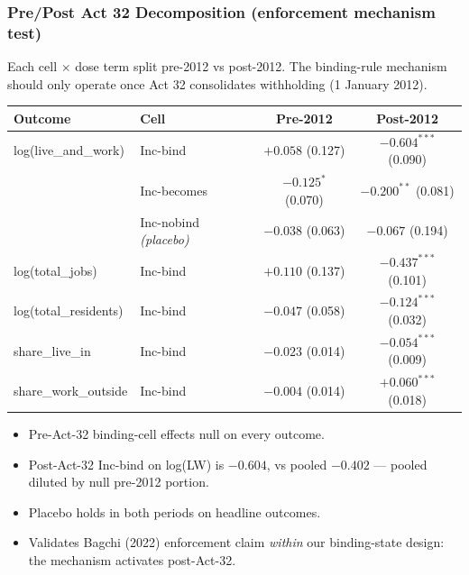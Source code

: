 \documentclass[xcolor = x11names, compress, aspectratio = 169]{beamer}
\begin{document}
    \begin{frame}
    \frametitle{Pre/Post Act 32 Decomposition (enforcement mechanism test)}
        \footnotesize
        Each cell $\times$ dose term split pre-2012 vs post-2012. The
        binding-rule mechanism should only operate once Act 32 consolidates
        withholding (1 January 2012).
        \medskip
        \scriptsize
        \renewcommand{\arraystretch}{1.05}
        \setlength{\tabcolsep}{4pt}
        \begin{tabular}{llcc}
            \toprule
            Outcome & Cell & Pre-2012 & Post-2012 \\
            \midrule
            log(live\_and\_work) & Inc-bind        & $+0.058$ (0.127) & \alert{$\bm{-0.604^{***}}$ (0.090)} \\
                                  & Inc-becomes     & $-0.125^{*}$ (0.070) & $-0.200^{**}$ (0.081) \\
                                  & Inc-nobind \emph{(placebo)} & $-0.038$ (0.063) & $-0.067$ (0.194) \\
            log(total\_jobs)     & Inc-bind        & $+0.110$ (0.137)  & $-0.437^{***}$ (0.101) \\
            log(total\_residents)& Inc-bind        & $-0.047$ (0.058)  & $-0.124^{***}$ (0.032) \\
            share\_live\_in      & Inc-bind        & $-0.023$ (0.014)  & $-0.054^{***}$ (0.009) \\
            share\_work\_outside & Inc-bind        & $-0.004$ (0.014)  & $+0.060^{***}$ (0.018) \\
            \bottomrule
        \end{tabular}
        \vspace{0.10cm}
        \begin{itemize}\setlength{\itemsep}{0.03cm}\scriptsize
            \item Pre-Act-32 binding-cell effects \alert{null on every outcome}.
            \item Post-Act-32 Inc-bind on log(LW) is $-0.604$, vs pooled $-0.402$
            --- pooled diluted by null pre-2012 portion.
            \item Placebo holds in both periods on headline outcomes.
            \item Validates Bagchi (2022) enforcement claim \emph{within}
            our binding-state design: the mechanism activates post-Act-32.
        \end{itemize}
    \end{frame}
\end{document}
